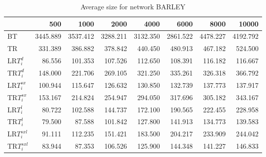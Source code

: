 \begin{table}
\begin{center}
\begin{tabular}{lrrrrrrr}
 & 500 & 1000 & 2000 & 4000 & 6000 & 8000 & 10000\\\hline
BT & 3445.889 & 3537.412 & 3288.211 & 3132.350 & 2861.522 & 4478.227 & 4192.792\\\hline
TR & 331.389 & 386.882 & 378.842 & 440.450 & 480.913 & 467.182 & 524.500\\\hline
LR$T_i^d$ & 86.556 & 101.353 & 107.526 & 112.650 & 108.391 & 116.182 & 116.667\\\hline
TR$T_i^d$ & 148.000 & 221.706 & 269.105 & 321.250 & 335.261 & 326.318 & 366.792\\\hline
LR$T_i^{sx}$ & 100.944 & 115.647 & 126.632 & 130.850 & 132.739 & 137.773 & 137.917\\\hline
TR$T_i^{sx}$ & 153.167 & 214.824 & 254.947 & 294.050 & 317.696 & 305.182 & 343.167\\\hline
LR$T_i^l$ & 80.722 & 102.588 & 144.737 & 172.100 & 190.565 & 222.455 & 228.958\\\hline
TR$T_i^l$ & 79.500 & 87.588 & 101.842 & 127.800 & 141.913 & 134.773 & 139.583\\\hline
LR$T_i^{sxl}$ & 91.111 & 112.235 & 151.421 & 183.500 & 204.217 & 233.909 & 244.042\\\hline
TR$T_i^{sxl}$ & 83.944 & 87.353 & 106.526 & 125.900 & 144.348 & 141.227 & 146.833\\\hline
\end{tabular}
\end{center}
\caption{Average size for network BARLEY }
\label{Barleysi}
\end{table}

